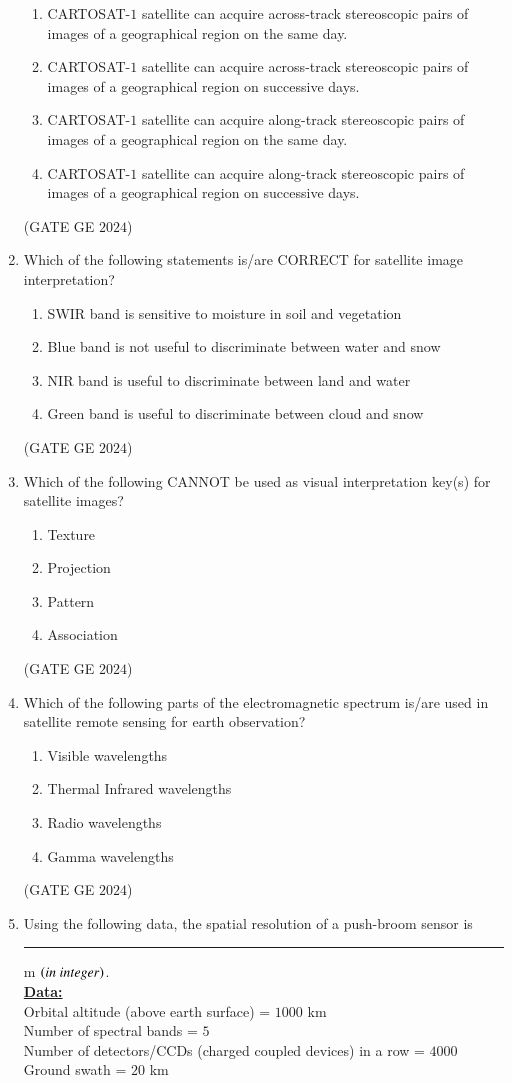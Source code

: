 \documentclass[journal,12pt,onecolumn]{IEEEtran}
\theoremstyle{remark}
\begin{document}
\begin{enumerate}
\begin{enumerate}
\item CARTOSAT-$1$ satellite can acquire across-track stereoscopic pairs of images of a geographical region on the same day.
\item CARTOSAT-$1$ satellite can acquire across-track stereoscopic pairs of images of a geographical region on successive days.
\item CARTOSAT-$1$ satellite can acquire along-track stereoscopic pairs of images of a geographical region on the same day.
\item CARTOSAT-$1$ satellite can acquire along-track stereoscopic pairs of images of a geographical region on successive days.
\end{enumerate}
\hfill{(GATE GE $2024$)}
\bigskip
\item Which of the following statements is/are CORRECT for satellite image interpretation?
\begin{enumerate}
\item SWIR band is sensitive to moisture in soil and vegetation
\item Blue band is not useful to discriminate between water and snow
\item NIR band is useful to discriminate between land and water
\item Green band is useful to discriminate between cloud and snow
\end{enumerate}
\hfill{(GATE GE $2024$)}
\bigskip
\item Which of the following CANNOT be used as visual interpretation key(s) for satellite images?
\begin{enumerate}
\item Texture
\item Projection
\item Pattern
\item Association
\end{enumerate}
\hfill{(GATE GE $2024$)}
\bigskip
\item Which of the following parts of the electromagnetic spectrum is/are used in satellite remote sensing for earth observation?
\begin{enumerate}
\item Visible wavelengths
\item Thermal Infrared wavelengths
\item Radio wavelengths
\item Gamma wavelengths
\end{enumerate}
\hfill{(GATE GE $2024$)}
\bigskip
\item Using the following data, the spatial resolution of a push-broom sensor is \rule{2cm}{0.5mm} m $\left(in\ integer\right)$.
\\
\underline{\textbf{Data:}} \\
Orbital altitude (above earth surface) = $1000$ km \\
Number of spectral bands = $5$ \\
Number of detectors/CCDs (charged coupled devices) in a row = $4000$ \\
Ground swath = $20$ km
\end{enumerate}
\end{document}
